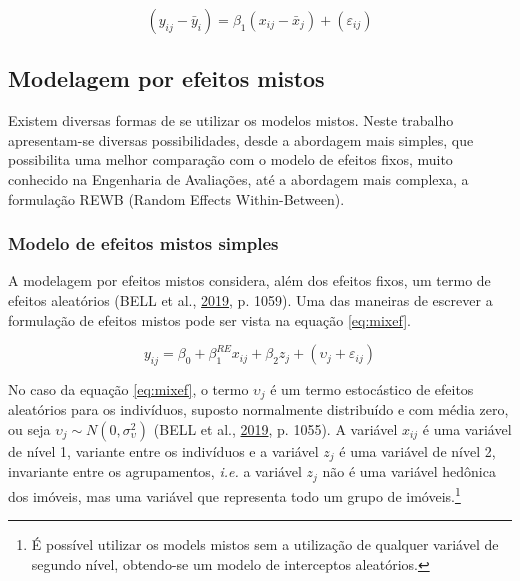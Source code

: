 \documentclass[
  a4paper, 11pt]{article}
\begin{document}
\begin{equation} \label{eq:fixef3}
(y_{ij} - \bar{y}_i) = \beta_1 (x_{ij} - \bar{x}_j) + (\varepsilon_{ij}) 
\end{equation}

\hypertarget{modelagem-por-efeitos-mistos}{%
\subsection{Modelagem por efeitos
mistos}\label{modelagem-por-efeitos-mistos}}

Existem diversas formas de se utilizar os modelos mistos. Neste trabalho
apresentam-se diversas possibilidades, desde a abordagem mais simples,
que possibilita uma melhor comparação com o modelo de efeitos fixos,
muito conhecido na Engenharia de Avaliações, até a abordagem mais
complexa, a formulação REWB (Random Effects Within-Between).

\hypertarget{modelo-de-efeitos-mistos-simples}{%
\subsubsection{Modelo de efeitos mistos
simples}\label{modelo-de-efeitos-mistos-simples}}

A modelagem por efeitos mistos considera, além dos efeitos fixos, um
termo de efeitos aleatórios (BELL et al.,
\protect\hyperlink{ref-bell2019}{2019}, p. 1059). Uma das maneiras de
escrever a formulação de efeitos mistos pode ser vista na equação
\ref{eq:mixef}.

\begin{equation} \label{eq:mixef}
y_{ij} = \beta_0 + \beta_1^{RE} x_{ij} + \beta_2 z_j + (\upsilon_j + \varepsilon_{ij}) 
\end{equation}

No caso da equação \ref{eq:mixef}, o termo \(\upsilon_j\) é um termo
estocástico de efeitos aleatórios para os indivíduos, suposto
normalmente distribuído e com média zero, ou seja
\(\upsilon_j \sim N(0, \sigma_{\upsilon}^2)\) (BELL et al.,
\protect\hyperlink{ref-bell2019}{2019}, p. 1055). A variável \(x_{ij}\)
é uma variável de nível 1, variante entre os indivíduos e a variável
\(z_j\) é uma variável de nível 2, invariante entre os agrupamentos,
\emph{i.e.} a variável \(z_j\) não é uma variável hedônica dos imóveis,
mas uma variável que representa todo um grupo de imóveis.\footnote{É
  possível utilizar os models mistos sem a utilização de qualquer
  variável de segundo nível, obtendo-se um modelo de interceptos
  aleatórios.}
\end{document}
